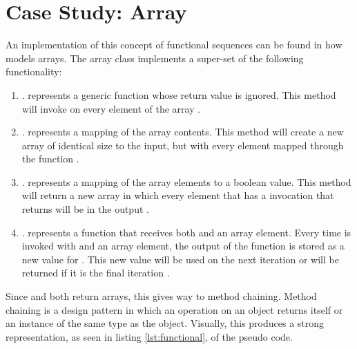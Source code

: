 \section{Case Study: \javascript Array}

An implementation of this concept of functional sequences can be found in how \javascript models arrays.  The array class implements a super-set of the following functionality:

\begin{enumerate}
  \item {}.   represents a generic function whose return value is ignored.  This method will invoke  on every element of the array \cite{arrayforeach16}.

  \item {}.   represents a mapping of the array contents.  This method will create a new array of identical size to the input, but with every element mapped through the  function \cite{arraymap16}.

  \item {}.   represents a mapping of the array elements to a boolean value.  This method will return a new array in which every element that has a  invocation that returns  will be in the output \cite{arrayfilter16}.

  \item {}.   represents a function that receives both  and an array element. Every time  is invoked with  and an array element, the output of the function is stored as a new value for .  This new value will be used on the next iteration or will be returned if it is the final iteration \cite{arrayreduce16}.

\end{enumerate}

Since  and  both return arrays, this gives way to method chaining. Method chaining is a design pattern in which an operation on an object returns itself or an instance of the same type as the object. Visually, this produces a strong representation, as seen in listing \ref{lst:functional}, of the pseudo code.

\begin{minipage}{\linewidth}

\end{minipage} 

